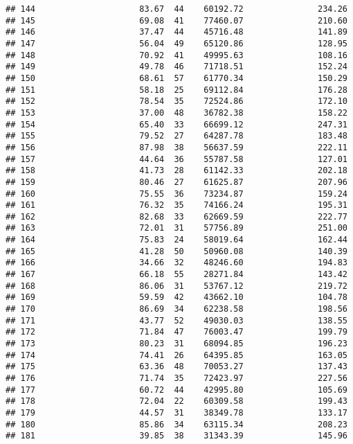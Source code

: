 \documentclass[
]{article}
\begin{document}
\begin{verbatim}
## 144                     83.67  44    60192.72               234.26
## 145                     69.08  41    77460.07               210.60
## 146                     37.47  44    45716.48               141.89
## 147                     56.04  49    65120.86               128.95
## 148                     70.92  41    49995.63               108.16
## 149                     49.78  46    71718.51               152.24
## 150                     68.61  57    61770.34               150.29
## 151                     58.18  25    69112.84               176.28
## 152                     78.54  35    72524.86               172.10
## 153                     37.00  48    36782.38               158.22
## 154                     65.40  33    66699.12               247.31
## 155                     79.52  27    64287.78               183.48
## 156                     87.98  38    56637.59               222.11
## 157                     44.64  36    55787.58               127.01
## 158                     41.73  28    61142.33               202.18
## 159                     80.46  27    61625.87               207.96
## 160                     75.55  36    73234.87               159.24
## 161                     76.32  35    74166.24               195.31
## 162                     82.68  33    62669.59               222.77
## 163                     72.01  31    57756.89               251.00
## 164                     75.83  24    58019.64               162.44
## 165                     41.28  50    50960.08               140.39
## 166                     34.66  32    48246.60               194.83
## 167                     66.18  55    28271.84               143.42
## 168                     86.06  31    53767.12               219.72
## 169                     59.59  42    43662.10               104.78
## 170                     86.69  34    62238.58               198.56
## 171                     43.77  52    49030.03               138.55
## 172                     71.84  47    76003.47               199.79
## 173                     80.23  31    68094.85               196.23
## 174                     74.41  26    64395.85               163.05
## 175                     63.36  48    70053.27               137.43
## 176                     71.74  35    72423.97               227.56
## 177                     60.72  44    42995.80               105.69
## 178                     72.04  22    60309.58               199.43
## 179                     44.57  31    38349.78               133.17
## 180                     85.86  34    63115.34               208.23
## 181                     39.85  38    31343.39               145.96

\end{verbatim}
\end{document}

